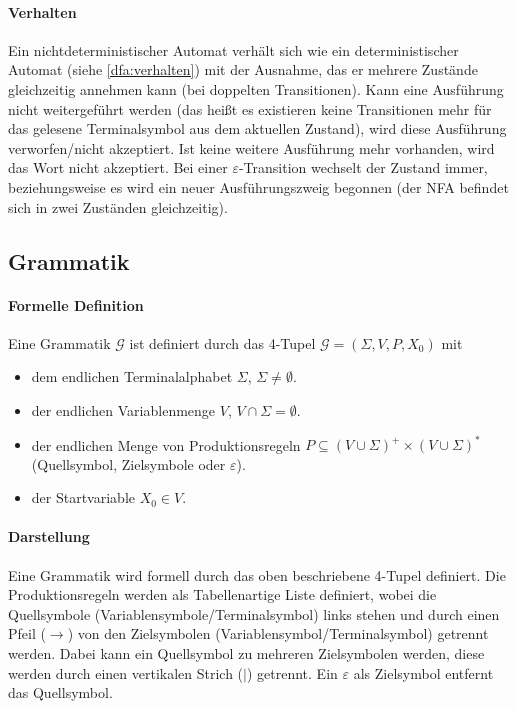 		\paragraph{Verhalten}
			Ein nichtdeterministischer Automat verhält sich wie ein deterministischer Automat (siehe \ref{dfa:verhalten}) mit der Ausnahme, das er mehrere Zustände gleichzeitig annehmen kann (bei doppelten Transitionen). Kann eine Ausführung nicht weitergeführt werden (das heißt es existieren keine Transitionen mehr für das gelesene Terminalsymbol aus dem aktuellen Zustand), wird diese Ausführung verworfen/nicht akzeptiert. Ist keine weitere Ausführung mehr vorhanden, wird das Wort nicht akzeptiert. Bei einer $ \varepsilon $-Transition wechselt der Zustand immer, beziehungsweise es wird ein neuer Ausführungszweig begonnen (der NFA befindet sich in zwei Zuständen gleichzeitig).


	\subsection{Grammatik}
		\paragraph{Formelle Definition}
			Eine Grammatik $ \mathcal{G} $ ist definiert durch das 4-Tupel $ \mathcal{G} = (\Sigma, V, P, X _ 0) $ mit
			\begin{itemize}
				\item dem endlichen Terminalalphabet $ \Sigma $, $ \Sigma \neq \emptyset $.
				\item der endlichen Variablenmenge $ V $, $ V \cap \Sigma = \emptyset $.
				\item der endlichen Menge von Produktionsregeln $ P \subseteq (V \cup \Sigma) ^ + \times (V \cup \Sigma) ^ * $ (Quellsymbol, Zielsymbole oder $ \varepsilon $).
				\item der Startvariable $ X _ 0 \in V $.
			\end{itemize}

		\paragraph{Darstellung}
			Eine Grammatik wird formell durch das oben beschriebene 4-Tupel definiert. Die Produktionsregeln werden als Tabellenartige Liste definiert, wobei die Quellsymbole (Variablensymbole/Terminalsymbol) links stehen und durch einen Pfeil ($ \rightarrow $) von den Zielsymbolen (Variablensymbol/Terminalsymbol) getrennt werden. Dabei kann ein Quellsymbol zu mehreren Zielsymbolen werden, diese werden durch einen vertikalen Strich ($ | $) getrennt. Ein $ \varepsilon $ als Zielsymbol entfernt das Quellsymbol.

